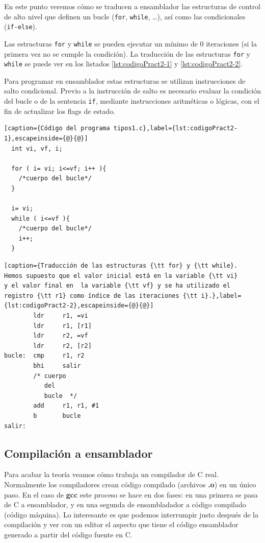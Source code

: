 En este punto veremos cómo se traducen a ensamblador las estructuras
de control de alto nivel que definen un bucle ({\tt for}, {\tt while},
\dots), así como las condicionales ({\tt if-else}).

Las estructuras {\tt for} y {\tt while} se pueden ejecutar un mínimo de 0
iteraciones (si la primera vez no se cumple la condición). La traducción de
las estructuras {\tt for} y {\tt while} se puede ver en los listados
\ref{lst:codigoPract2-1} y \ref{lst:codigoPract2-2}.

Para programar en ensamblador estas estructuras se utilizan instrucciones
de salto condicional. Previo a la instrucción de salto es necesario evaluar
la condición del bucle o de la sentencia {\tt if}, mediante instrucciones
aritméticas o lógicas, con el fin de actualizar los flags de estado.

\begin{lstlisting}[caption={Código del programa tipos1.c},label={lst:codigoPract2-1},escapeinside={@}{@}]
  int vi, vf, i;

  for ( i= vi; i<=vf; i++ ){ 
    /*cuerpo del bucle*/
  }

  i= vi; 
  while ( i<=vf ){ 
    /*cuerpo del bucle*/
    i++; 
  }
\end{lstlisting}

\begin{lstlisting}[caption={Traducción de las estructuras {\tt for} y {\tt while}.
Hemos supuesto que el valor inicial está en la variable {\tt vi}
y el valor final en  la variable {\tt vf} y se ha utilizado el
registro {\tt r1} como índice de las iteraciones {\tt i}.},label={lst:codigoPract2-2},escapeinside={@}{@}]
        ldr     r1, =vi
        ldr     r1, [r1]
        ldr     r2, =vf
        ldr     r2, [r2]
bucle:  cmp     r1, r2
        bhi     salir
        /* cuerpo
           del
           bucle  */
        add     r1, r1, #1
        b       bucle
salir:
\end{lstlisting}

\subsection{Compilación a ensamblador}

Para acabar la teoría veamos cómo trabaja un compilador de C real. Normalmente
los compiladores crean código compilado (archivos {\bf .o}) en un
único paso. En el caso de {\bf gcc} este proceso se hace en dos fases: en una
primera se pasa de C a ensamblador, y en una segunda de ensambladador a código
compilado (código máquina). Lo interesante es que podemos interrumpir justo
después de la compilación y ver con un editor el aspecto que tiene el código
ensamblador generado a partir del código fuente en C.

